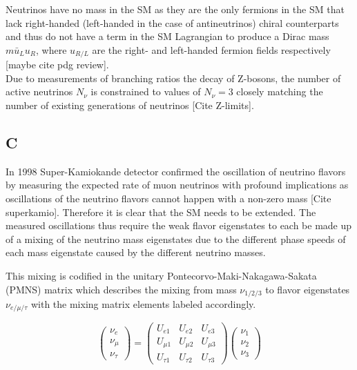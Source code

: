 \documentclass[a4paper,12pt,numbered]{article}
\begin{document}
Neutrinos have no mass in the SM as they are the only fermions in the SM that lack right-handed (left-handed in the case of antineutrinos) chiral counterparts and thus do not have a term in the SM Lagrangian to produce a Dirac mass $m \bar{u}_L u_R$, where $u_{R/L}$ are the right- and left-handed fermion fields respectively [maybe cite pdg review]. 
\\
Due to measurements of branching ratios the decay of Z-bosons, the number of active neutrinos $N_\nu$ is constrained to values of $N_\nu =3$ closely matching the number of existing generations of neutrinos [Cite Z-limits].

\subsection{C}

In 1998 Super-Kamiokande detector confirmed the oscillation of neutrino flavors by measuring the expected rate of muon neutrinos  with profound implications as oscillations of the neutrino flavors cannot happen with a non-zero mass [Cite superkamio]. Therefore it is clear that the SM needs to be extended.
The measured oscillations thus require the weak flavor eigenstates to each be made up of a mixing of the neutrino mass eigenstates due to the different phase speeds of each mass eigenstate caused by the different neutrino masses.

This mixing is codified in the unitary Pontecorvo-Maki-Nakagawa-Sakata (PMNS) matrix which describes the mixing from mass $\nu_{1/2/3}$ to flavor eigenstates $\nu_{e/\mu/\tau}$ with the mixing matrix elements labeled accordingly.

\begin{equation}
\begin{pmatrix}
\nu_e \\
\nu_\mu \\
\nu_\tau
\end{pmatrix}
=
\begin{pmatrix}
U_{e1} & U_{e2} & U_{e3} \\
U_{\mu 1} & U_{\mu 2} & U_{\mu 3} \\
U_{\tau 1} & U_{\tau 2} & U_{\tau 3}
\end{pmatrix}
\begin{pmatrix}
\nu_1 \\
\nu_2 \\
\nu_3
\end{pmatrix}
\end{equation}
\end{document}
